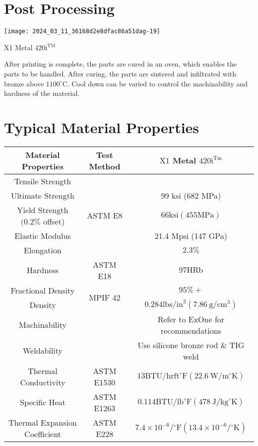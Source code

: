 \documentclass[10pt]{article}
\begin{document}
\section*{Post Processing}
\begin{center}
\texttt{[image: 2024\_03\_11\_36168d2e8dfac86a51dag-19]}
\end{center}

X1 Metal $420 \mathrm{i}^{\mathrm{TM}}$

After printing is complete, the parts are cured in an oven, which enables the parts to be handled. After curing, the parts are sintered and infiltrated with bronze above $1100^{\circ} \mathrm{C}$. Cool down can be varied to control the machinability and hardness of the material.

\section*{Typical Material Properties}
\begin{center}
\begin{tabular}{|c|c|c|}
\hline
Material Properties & Test Method & $\mathrm{X} 1$ Metal $420 \mathrm{i}^{\mathrm{Tm}}$ \\
\hline
Tensile Strength & \multirow{5}{*}{ASTM E8} &  \\
\hline
Ultimate Strength &  & 99 ksi (682 MPa) \\
\hline
Yield Strength $(0.2 \%$ offset) &  & $66 \mathrm{ksi}(455 \mathrm{MPa})$ \\
\hline
Elastic Modulus &  & 21.4 Mpsi (147 GPa) \\
\hline
Elongation &  & $2.3 \%$ \\
\hline
Hardness & ASTM E18 & $97 \mathrm{HRb}$ \\
\hline
Fractional Density & \multirow{2}{*}{MPIF 42} & $95 \%+$ \\
\hline
Density &  & $0.284 \mathrm{lbs} / \mathrm{in}^{3}\left(7.86 \mathrm{~g} / \mathrm{cm}^{3}\right)$ \\
\hline
Machinability &  & Refer to ExOne for recommendations \\
\hline
Weldability &  & Use silicone bronze rod \& TIG weld \\
\hline
Thermal Conductivity & ASTM E1530 & $13 \mathrm{BTU} / \mathrm{hr} \mathrm{ft}^{\circ} \mathrm{F}\left(22.6 \mathrm{~W} / \mathrm{m}^{\circ} \mathrm{K}\right)$ \\
\hline
Specific Heat & ASTM E1263 & $0.114 \mathrm{BTU} / \mathrm{lb}^{\circ} \mathrm{F}\left(478 \mathrm{~J} / \mathrm{kg}^{\circ} \mathrm{K}\right)$ \\
\hline
Thermal Expansion Coefficient & ASTM E228 & $7.4 \times 10^{-6} /{ }^{\circ} \mathrm{F}\left(13.4 \times 10^{-6} /{ }^{\circ} \mathrm{K}\right)$ \\
\hline
\end{tabular}
\end{center}
\end{document}
